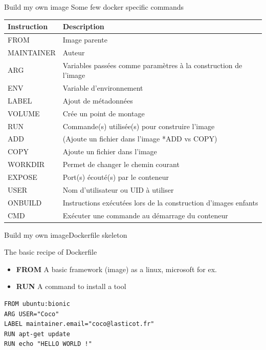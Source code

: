 \begin{frame}{Build my own image}
Some few docker specific commands
\newline
\newline
\centering
\begin{tabular}{ll}
Instruction & Description \\
\hline\hline
FROM & Image parente \\
MAINTAINER & Auteur \\
ARG & Variables passées comme paramètres à la construction de l'image \\
ENV & Variable d'environnement \\
LABEL & Ajout de métadonnées \\
VOLUME & Crée un point de montage \\
RUN & Commande(s) utilisée(s) pour construire l'image \\
ADD & (Ajoute un fichier dans l'image *ADD vs COPY) \\
COPY & Ajoute un fichier dans l'image \\
WORKDIR & Permet de changer le chemin courant \\
EXPOSE & Port(s) écouté(s) par le conteneur \\
USER & Nom d'utilisateur ou UID à utiliser \\
ONBUILD & Instructions exécutées lors de la construction d'images enfants \\
CMD & Exécuter une commande au démarrage du conteneur \\
\end{tabular}
\end{frame}

\begin{frame}[fragile]{Build my own image}{Dockerfile skeleton}
\begin{block}{The basic recipe of Dockerfile}
\begin{itemize}
\item \textbf{FROM} A basic framework (image) as a linux, microsoft for ex. 
\item \textbf{RUN} A command to install a tool
\end{itemize}
\end{block}
\begin{verbatim}
FROM ubuntu:bionic
ARG USER="Coco"
LABEL maintainer.email="coco@lasticot.fr"
RUN apt-get update
RUN echo "HELLO WORLD !"
\end{verbatim}
\end{frame}

